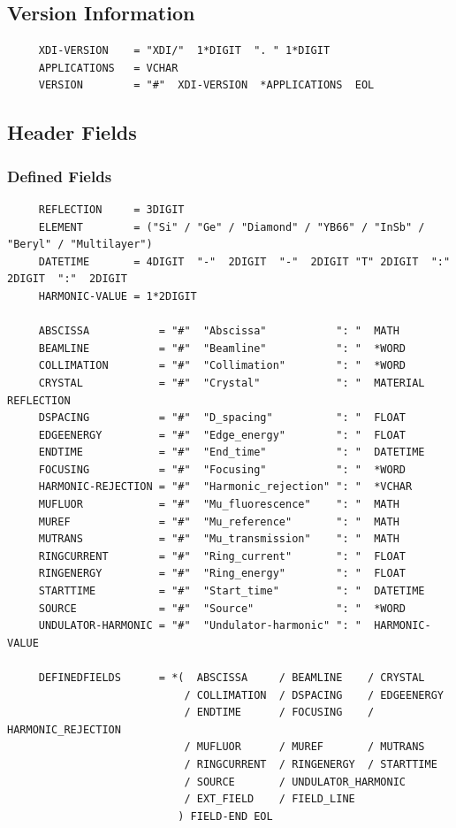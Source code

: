 \documentclass{article}
\begin{document}
\subsection{Version Information}
\label{apdx:gram_version}
\begin{verbatim}
     XDI-VERSION    = "XDI/"  1*DIGIT  ". " 1*DIGIT
     APPLICATIONS   = VCHAR
     VERSION        = "#"  XDI-VERSION  *APPLICATIONS  EOL
\end{verbatim}

\subsection{Header Fields}
\label{apdx:gram_hdr_fields}

\subsubsection{Defined Fields}
\label{apdx:gram_hdr_defined}
\begin{verbatim}
     REFLECTION     = 3DIGIT
     ELEMENT        = ("Si" / "Ge" / "Diamond" / "YB66" / "InSb" / "Beryl" / "Multilayer")
     DATETIME       = 4DIGIT  "-"  2DIGIT  "-"  2DIGIT "T" 2DIGIT  ":"  2DIGIT  ":"  2DIGIT
     HARMONIC-VALUE = 1*2DIGIT

     ABSCISSA           = "#"  "Abscissa"           ": "  MATH
     BEAMLINE           = "#"  "Beamline"           ": "  *WORD
     COLLIMATION        = "#"  "Collimation"        ": "  *WORD
     CRYSTAL            = "#"  "Crystal"            ": "  MATERIAL  REFLECTION
     DSPACING           = "#"  "D_spacing"          ": "  FLOAT
     EDGEENERGY         = "#"  "Edge_energy"        ": "  FLOAT
     ENDTIME            = "#"  "End_time"           ": "  DATETIME
     FOCUSING           = "#"  "Focusing"           ": "  *WORD
     HARMONIC-REJECTION = "#"  "Harmonic_rejection" ": "  *VCHAR
     MUFLUOR            = "#"  "Mu_fluorescence"    ": "  MATH
     MUREF              = "#"  "Mu_reference"       ": "  MATH
     MUTRANS            = "#"  "Mu_transmission"    ": "  MATH
     RINGCURRENT        = "#"  "Ring_current"       ": "  FLOAT
     RINGENERGY         = "#"  "Ring_energy"        ": "  FLOAT
     STARTTIME          = "#"  "Start_time"         ": "  DATETIME
     SOURCE             = "#"  "Source"             ": "  *WORD
     UNDULATOR-HARMONIC = "#"  "Undulator-harmonic" ": "  HARMONIC-VALUE

     DEFINEDFIELDS      = *(  ABSCISSA     / BEAMLINE    / CRYSTAL
                            / COLLIMATION  / DSPACING    / EDGEENERGY
                            / ENDTIME      / FOCUSING    / HARMONIC_REJECTION
                            / MUFLUOR      / MUREF       / MUTRANS
                            / RINGCURRENT  / RINGENERGY  / STARTTIME 
                            / SOURCE       / UNDULATOR_HARMONIC
                            / EXT_FIELD    / FIELD_LINE
                           ) FIELD-END EOL
\end{verbatim}
\end{document}
